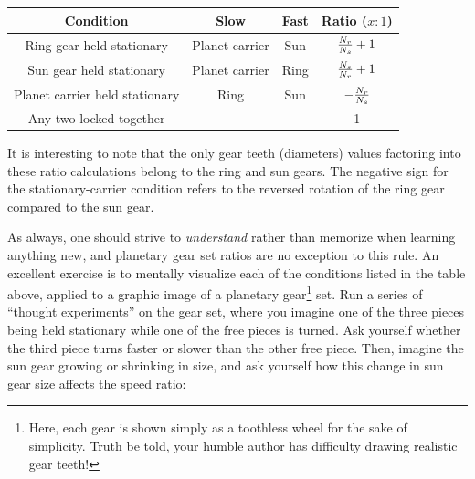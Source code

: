 \begin{center}
\begin{tabular}{| c | c | c | c |}
\hline 
\textbf{Condition} & \textbf{Slow} & \textbf{Fast} & \textbf{Ratio} ($x:1$) \\[3pt] \hline
Ring gear held stationary & Planet carrier & Sun & ${N_r \over N_s} + 1$ \\[3pt] \hline 
Sun gear held stationary & Planet carrier & Ring & ${N_s \over N_r} + 1$ \\[3pt] \hline 
Planet carrier held stationary & Ring & Sun & $-{N_r \over N_s}$ \\[3pt] \hline 
Any two locked together & --- & --- & 1 \\[3pt] \hline 
\end{tabular}
\end{center}

It is interesting to note that the only gear teeth (diameters) values factoring into these ratio calculations belong to the ring and sun gears.  The negative sign for the stationary-carrier condition refers to the reversed rotation of the ring gear compared to the sun gear.

As always, one should strive to \textit{understand} rather than memorize when learning anything new, and planetary gear set ratios are no exception to this rule.  An excellent exercise is to mentally visualize each of the conditions listed in the table above, applied to a graphic image of a planetary gear\footnote{Here, each gear is shown simply as a toothless wheel for the sake of simplicity.  Truth be told, your humble author has difficulty drawing realistic gear teeth!} set.  Run a series of ``thought experiments'' on the gear set, where you imagine one of the three pieces being held stationary while one of the free pieces is turned.  Ask yourself whether the third piece turns faster or slower than the other free piece.  Then, imagine the sun gear growing or shrinking in size, and ask yourself how this change in sun gear size affects the speed ratio:

